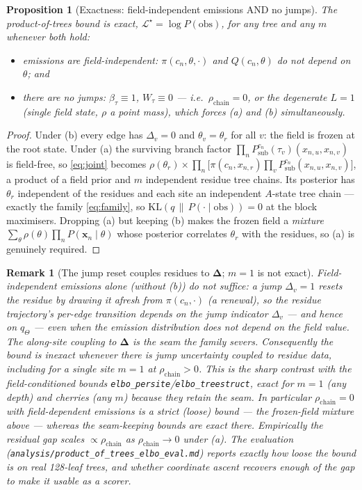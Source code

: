 \documentclass[11pt]{article}
\newtheorem{proposition}{Proposition}
\newtheorem{remark}{Remark}
\newcommand{\bDelta}{\bm{\Delta}}
\newcommand{\bx}{\bm{x}}
\newcommand{\KL}[2]{\mathrm{KL}\!\left(#1\,\|\,#2\right)}
\newcommand{\Psub}{P_{\mathrm{sub}}}
\begin{document}
\begin{proposition}[Exactness: field-independent emissions AND no jumps]
\label{prop:exact}
The product-of-trees bound is exact, $\mathcal L^\star=\log P(\mathrm{obs})$,
for any tree and any $m$ whenever both hold:
\begin{itemize}
\item[(a)] emissions are field-independent: $\pi(c_n,\theta,\cdot)$ and
      $Q(c_n,\theta)$ do not depend on $\theta$; and
\item[(b)] there are no jumps: $\beta_\tau\equiv1$, $W_\tau\equiv0$ --- i.e.\
      $\rho_{\mathrm{chain}}=0$, or the degenerate $L=1$ (single field state,
      $\rho$ a point mass), which forces (a) and (b) simultaneously.
\end{itemize}
\end{proposition}
\begin{proof}
Under (b) every edge has $\Delta_v=0$ and $\theta_v=\theta_r$ for all $v$: the
field is frozen at the root state. Under (a) the surviving branch factor
$\prod_n\Psub^{c_n}(\tau_v)(x_{n,u},x_{n,v})$ is field-free, so
\eqref{eq:joint} becomes
$\rho(\theta_r)\times\prod_n\big[\pi(c_n,x_{n,r})\prod_v\Psub^{c_n}(x_{n,u},x_{n,v})\big]$,
a product of a field prior and $m$ independent residue tree chains. Its
posterior has $\theta_r$ independent of the residues and each site an
independent $A$-state tree chain --- exactly the family \eqref{eq:family}, so
$\KL{q}{P(\cdot\mid\mathrm{obs})}=0$ at the block maximisers. Dropping (a) but
keeping (b) makes the frozen field a \emph{mixture}
$\sum_\theta\rho(\theta)\prod_n P(\bx_n\mid\theta)$ whose posterior correlates
$\theta_r$ with the residues, so (a) is genuinely required.
\end{proof}

\begin{remark}[The jump reset couples residues to $\bDelta$; $m=1$ is not exact]
Field-independent emissions alone (without (b)) do \emph{not} suffice: a jump
$\Delta_v=1$ \emph{resets} the residue by drawing it afresh from $\pi(c_n,\cdot)$
(a renewal), so the residue trajectory's per-edge transition depends on the
jump indicator $\Delta_v$ --- and hence on $q_\Theta$ --- even when the
emission distribution does not depend on the field \emph{value}. The
along-site coupling to $\bDelta$ is the seam the family severs. Consequently
the bound is inexact whenever there is jump uncertainty coupled to residue
data, \emph{including for a single site} $m=1$ at $\rho_{\mathrm{chain}}>0$.
This is the sharp contrast with the field-conditioned bounds
\texttt{elbo\_persite}/\texttt{elbo\_treestruct}, exact for $m=1$ (any depth)
and cherries (any $m$) because they retain the seam. In particular
$\rho_{\mathrm{chain}}=0$ with field-\emph{dependent} emissions is a strict
(loose) bound --- the frozen-field mixture above --- whereas the seam-keeping
bounds are exact there. Empirically the residual gap scales $\propto
\rho_{\mathrm{chain}}$ as $\rho_{\mathrm{chain}}\to0$ under (a).
The evaluation (\texttt{analysis/product\_of\_trees\_elbo\_eval.md}) reports
exactly how loose the bound is on real 128-leaf trees, and whether coordinate
ascent recovers enough of the gap to make it usable as a scorer.
\end{remark}
\end{document}
